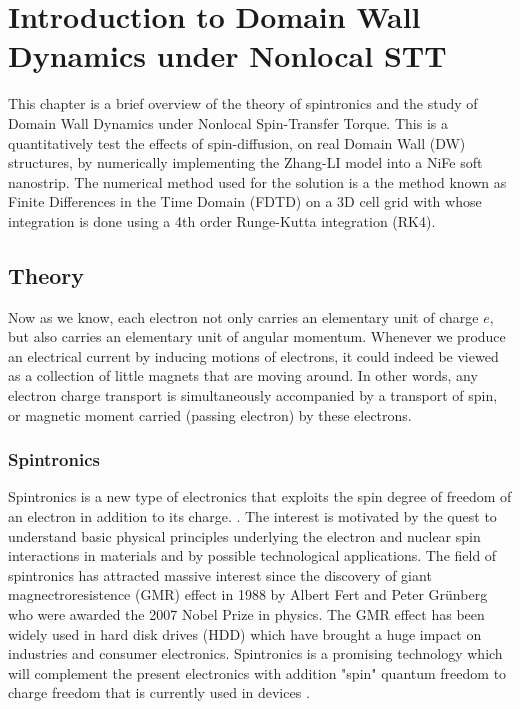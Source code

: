 
\chapter{Introduction to Domain Wall Dynamics under Nonlocal STT} %

\label{Introduction to Domain Wall Dynamics under Nonlocal STT} %



This chapter is a brief overview of the theory of spintronics and the study of Domain Wall Dynamics under Nonlocal Spin-Transfer Torque. This is a quantitatively test the effects of spin-diffusion, on real Domain Wall (DW) structures, by numerically implementing the Zhang-LI model into a NiFe soft nanostrip. The numerical method used for the solution is a the method known as Finite Differences in the Time Domain (FDTD) on a 3D cell grid with whose integration is done using a 4th order Runge-Kutta integration (RK4).

\section{Theory}

Now as we know, each electron not only carries an elementary
unit of charge $e$, but also carries an elementary unit of angular momentum. Whenever we produce an electrical current by inducing
motions of electrons, it could indeed be viewed as a collection of little magnets that are moving around. In other words, any electron charge transport is simultaneously accompanied by a transport of spin, or magnetic moment carried (passing electron) by these electrons\cite{cornell}.

\subsection{Spintronics}

Spintronics is a new type of electronics that exploits the spin degree of freedom of an electron in addition to its charge. \cite{spinz}. The interest is motivated by the quest to understand basic physical principles underlying the electron and nuclear spin interactions in materials and by possible technological applications. The field of spintronics has attracted massive interest since the discovery of giant magnectroresistence (GMR) effect in 1988 by Albert Fert and Peter Gr\"{u}nberg who were awarded the 2007 Nobel Prize in physics. The GMR effect has been widely used in hard disk drives (HDD) which have brought a huge impact on industries and consumer electronics. Spintronics is a promising technology which will complement the present electronics with addition "spin" quantum freedom to charge freedom that is currently used in devices \cite{nonlocalspin}.


